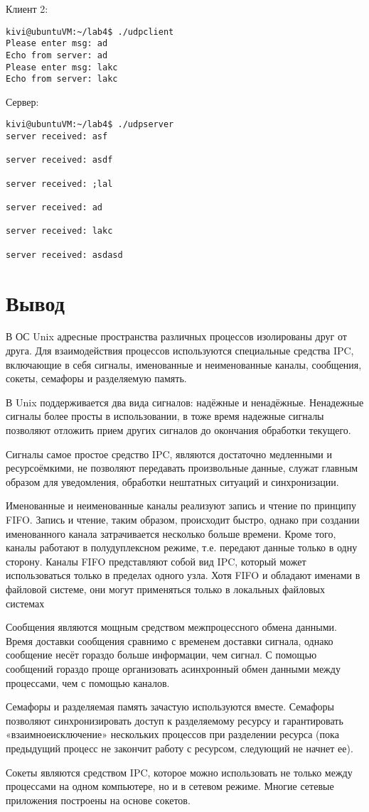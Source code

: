 \documentclass[a4paper]{article}
\begin{document}
	Клиент 2:
	\begin{lstlisting}[style=crs_bash]
kivi@ubuntuVM:~/lab4$ ./udpclient 
Please enter msg: ad
Echo from server: ad
Please enter msg: lakc
Echo from server: lakc
	\end{lstlisting}
	
	Сервер:
	\begin{lstlisting}[style=crs_bash]
kivi@ubuntuVM:~/lab4$ ./udpserver 
server received: asf

server received: asdf

server received: ;lal

server received: ad

server received: lakc

server received: asdasd

	\end{lstlisting}
	
\section{Вывод}
	В ОС Unix адресные пространства различных процессов изолированы друг от друга. Для взаимодействия процессов используются специальные средства IPC, включающие в себя сигналы, именованные и неименованные каналы, сообщения, сокеты, семафоры и разделяемую память.
	
	В Unix поддерживается два вида сигналов: надёжные и ненадёжные. Ненадежные сигналы более просты в использовании, в тоже время надежные сигналы позволяют отложить прием других сигналов до окончания обработки текущего.
	
	Сигналы самое простое средство IPC, являются достаточно медленными и ресурсоёмкими, не позволяют передавать произвольные данные, служат главным образом для уведомления, обработки нештатных ситуаций и синхронизации.
	
	Именованные и неименованные каналы реализуют запись и чтение по принципу FIFO. Запись и чтение, таким образом, происходит быстро, однако при создании именованного канала затрачивается несколько больше времени. Кроме того, каналы работают в полудуплексном режиме, т.е. передают данные только в одну сторону. Каналы FIFO представляют собой вид IPC, который может использоваться только в пределах одного узла. Хотя FIFO и обладают именами в файловой системе, они могут применяться только в локальных файловых системах

	Сообщения являются мощным средством межпроцессного обмена данными. Время доставки сообщения сравнимо с временем доставки сигнала, однако сообщение несёт гораздо больше информации, чем сигнал. С помощью сообщений гораздо проще организовать асинхронный обмен данными между процессами, чем с помощью каналов.
	
	Семафоры и разделяемая память зачастую используются вместе. Семафоры позволяют синхронизировать доступ к разделяемому ресурсу и гарантировать «взаимноеисключение» нескольких процессов при разделении ресурса (пока предыдущий процесс не закончит работу с ресурсом, следующий не начнет ее).
	
	Сокеты являются средством IPC, которое можно использовать не только между процессами на одном компьютере, но и в сетевом режиме. Многие сетевые приложения построены на основе сокетов.
\end{document}
